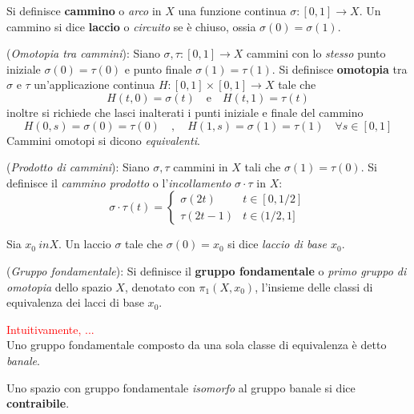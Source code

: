 \begin{definition}
   Si definisce \textbf{cammino} o \emph{arco} in $X$ una funzione continua
   $\sigma : [0,1] \to X$. Un cammino si dice \textbf{laccio} o \emph{circuito}
   se è chiuso, ossia $\sigma(0) = \sigma(1)$.
\end{definition}

\begin{definition}(\emph{Omotopia tra cammini}):
   Siano $\sigma,\tau : [0,1] \to X$ cammini con lo \emph{stesso} punto iniziale
   $\sigma(0) = \tau(0)$ e punto finale $\sigma(1) = \tau(1)$.
   Si definisce \textbf{omotopia} tra $\sigma$ e $\tau$ un'applicazione continua
   $H : [0,1] \times [0,1] \to X$ tale che
      $$ H(t,0) = \sigma(t) \quad \mathrm{e} \quad H(t,1) = \tau(t) $$
   inoltre si richiede che lasci inalterati i punti iniziale e finale del cammino
      $$ H(0,s) = \sigma(0) = \tau(0) \quad , \quad
         H(1,s) = \sigma(1) = \tau(1) \quad \forall s \in [0,1] $$
   Cammini omotopi si dicono \emph{equivalenti}.
\end{definition}

\begin{definition}(\emph{Prodotto di cammini}):
   Siano $\sigma,\tau$ cammini in $X$ tali che $\sigma(1) = \tau(0)$. Si definisce
   il \emph{cammino prodotto} o l'\emph{incollamento} $\sigma \cdot \tau$ in $X$:
   \begin{equation}
      \sigma \cdot \tau (t) = \begin{cases}
         \sigma(2t) & t \in [0,1/2] \\
         \tau(2t-1) & t \in (1/2,1]
      \end{cases}
   \end{equation}
\end{definition}

Sia $x_0\ in X$. Un laccio $\sigma$ tale che $\sigma(0) = x_0$ si dice
\emph{laccio di base $x_0$}.

\begin{definition}(\emph{Gruppo fondamentale}):
   Si definisce il \textbf{gruppo fondamentale} o \emph{primo gruppo di omotopia}
   dello spazio $X$, denotato con $\pi_1(X,x_0)$, l'insieme delle classi di
   equivalenza dei lacci di base $x_0$.
\end{definition}
\textcolor{red}{Intuitivamente, ...}\\

Uno gruppo fondamentale composto da una sola classe di equivalenza è detto \emph{banale}.

\begin{definition}
   Uno spazio con gruppo fondamentale \emph{isomorfo} al gruppo banale si dice
   \textbf{contraibile}.
\end{definition}

